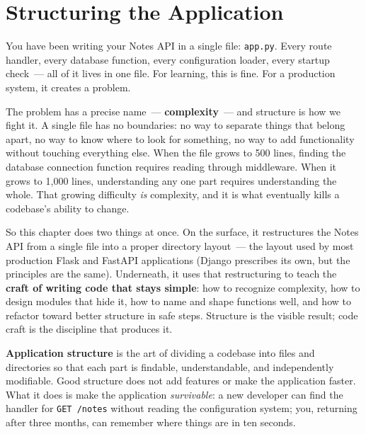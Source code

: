 \setcounter{chapter}{14}
\chapter{Structuring the Application}\label{ch:15-structuring-the-application}

\chapterrule

You have been writing your Notes API in a single file: \texttt{app.py}. Every route handler, every database function, every configuration loader, every startup check~--- all of it lives in one file. For learning, this is fine. For a production system, it creates a problem.

The problem has a precise name~--- \textbf{complexity}~--- and structure is how we fight it. A single file has no boundaries: no way to separate things that belong apart, no way to know where to look for something, no way to add functionality without touching everything else. When the file grows to 500 lines, finding the database connection function requires reading through middleware. When it grows to 1,000 lines, understanding any one part requires understanding the whole. That growing difficulty \emph{is} complexity, and it is what eventually kills a codebase's ability to change.

So this chapter does two things at once. On the surface, it restructures the Notes API from a single file into a proper directory layout~--- the layout used by most production Flask and FastAPI applications (Django prescribes its own, but the principles are the same). Underneath, it uses that restructuring to teach the \textbf{craft of writing code that stays simple}: how to recognize complexity, how to design modules that hide it, how to name and shape functions well, and how to refactor toward better structure in safe steps. Structure is the visible result; code craft is the discipline that produces it.

\textbf{Application structure} is the art of dividing a codebase into files and directories so that each part is findable, understandable, and independently modifiable. Good structure does not add features or make the application faster. What it does is make the application \emph{survivable}: a new developer can find the handler for \texttt{GET\ /notes} without reading the configuration system; you, returning after three months, can remember where things are in ten seconds.

